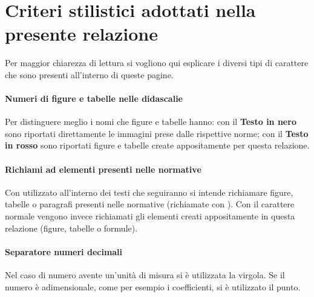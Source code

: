 \section{Criteri stilistici adottati nella presente relazione}
Per maggior chiarezza di lettura si vogliono qui esplicare i diversi tipi di carattere che sono presenti all'interno di queste pagine.
\paragraph*{Numeri di figure e tabelle nelle didascalie} Per distinguere meglio i nomi che figure e tabelle hanno: con il \textbf{Testo in nero} sono riportati direttamente le immagini prese dalle rispettive norme; con il \textbf{\textcolor{pantone186}{Testo in rosso}} sono riportati figure e tabelle create appositamente per questa relazione.
\paragraph*{Richiami ad elementi presenti nelle normative} Con  utilizzato all'interno dei testi che seguiranno si intende richiamare figure, tabelle o paragrafi presenti nelle normative (richiamate con ).
Con il carattere normale vengono invece richiamati gli elementi creati appositamente in questa relazione (figure, tabelle o formule).
\paragraph*{Separatore numeri decimali} Nel caso di numero avente un'unità di misura si è utilizzata la virgola. 
Se il numero è adimensionale, come per esempio i coefficienti, si è utilizzato il punto.

